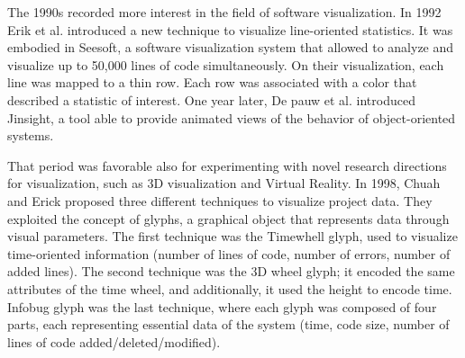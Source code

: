 The 1990s recorded more interest in the field of software visualization. 
In 1992 Erik et al. \cite{Eick1992} introduced a new technique to visualize line-oriented statistics. 
It was embodied in Seesoft, a software visualization system that allowed to analyze and visualize up to 50,000 lines of code simultaneously. 
On their visualization, each line was mapped to a thin row. Each row was associated with a color that described a statistic of interest.
One year later, De pauw et al. \cite{DePauw1993} introduced Jinsight, a tool able to provide animated views of the behavior of object-oriented systems. 



That period was favorable also for experimenting with novel research directions for visualization, 
such as 3D visualization and Virtual Reality. 
In 1998, Chuah and Erick \cite{Chuah1998} proposed three different techniques to visualize project data. 
They exploited the concept of glyphs, a graphical object that represents data through visual parameters. 
The first technique was the Timewhell glyph, used to visualize time-oriented information (number of lines of code, number of errors, number of added lines). 
The second technique was the 3D wheel glyph; it encoded the same attributes of the time wheel, and additionally, it used the height to encode time. 
Infobug glyph was the last technique, where each glyph was composed of four parts, each representing essential data of the system (time, code size, number of lines of code added/deleted/modified). \newline


